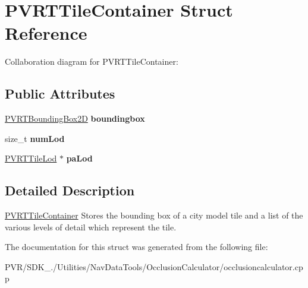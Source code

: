 \hypertarget{struct_p_v_r_t_tile_container}{\section{P\+V\+R\+T\+Tile\+Container Struct Reference}
\label{struct_p_v_r_t_tile_container}
}


Collaboration diagram for P\+V\+R\+T\+Tile\+Container\+:
\subsection*{Public Attributes}
\begin{DoxyCompactItemize}
\item 
\hypertarget{struct_p_v_r_t_tile_container_a22521b70d5b93cb5b24218f5375e733c}{\hyperlink{struct_p_v_r_t_bounding_box2_d}{P\+V\+R\+T\+Bounding\+Box2\+D} {\bfseries boundingbox}}\label{struct_p_v_r_t_tile_container_a22521b70d5b93cb5b24218f5375e733c}

\item 
\hypertarget{struct_p_v_r_t_tile_container_a2276f32f3b5011f29d96c615ed100465}{size\+\_\+t {\bfseries num\+Lod}}\label{struct_p_v_r_t_tile_container_a2276f32f3b5011f29d96c615ed100465}

\item 
\hypertarget{struct_p_v_r_t_tile_container_ac21b640cd7f74e54b387d242df22d504}{\hyperlink{struct_p_v_r_t_tile_lod}{P\+V\+R\+T\+Tile\+Lod} $\ast$ {\bfseries pa\+Lod}}\label{struct_p_v_r_t_tile_container_ac21b640cd7f74e54b387d242df22d504}

\end{DoxyCompactItemize}


\subsection{Detailed Description}


  \hyperlink{struct_p_v_r_t_tile_container}{P\+V\+R\+T\+Tile\+Container}  Stores the bounding box of a city model tile and a list of the various levels of detail which represent the tile. 

The documentation for this struct was generated from the following file\+:\begin{DoxyCompactItemize}
\item 
P\+V\+R/\+S\+D\+K\+\_./\+Utilities/\+Nav\+Data\+Tools/\+Occlusion\+Calculator/occlusioncalculator.\+cpp\end{DoxyCompactItemize}
